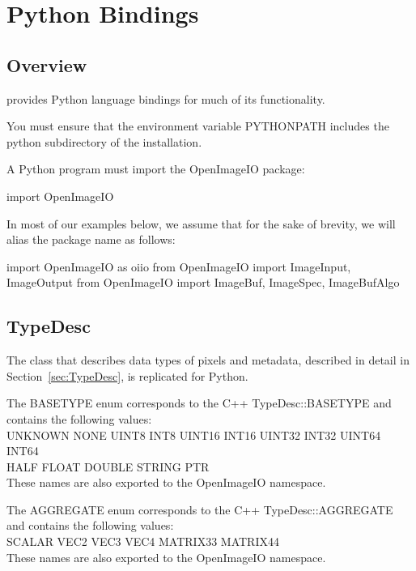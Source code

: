 \chapter{Python Bindings}
\label{chap:pythonbindings}

\section{Overview}

\OpenImageIO provides Python language bindings for much of its
functionality.

\smallskip

You must ensure that the environment variable {\cf PYTHONPATH} includes
the {\cf python} subdirectory of the \OpenImageIO installation.

\smallskip

A Python program must import the {\cf OpenImageIO} package:
\begin{code}
    import OpenImageIO
\end{code}
\noindent In most of our examples below, we assume that for the sake
of brevity, we will alias the package name as follows:
\begin{code}
    import OpenImageIO as oiio
    from OpenImageIO import ImageInput, ImageOutput
    from OpenImageIO import ImageBuf, ImageSpec, ImageBufAlgo
\end{code}

\section{TypeDesc}
\label{sec:pythontypedesc}

The \TypeDesc class that describes data types of pixels and metadata,
described in detail in Section~\ref{sec:TypeDesc}, is replicated for Python.

The {\cf BASETYPE} enum corresponds to the C++ {\cf TypeDesc::BASETYPE} and
contains the following values: \\
{\cf UNKNOWN NONE UINT8 INT8 UINT16 INT16 UINT32 INT32 UINT64 INT64 \\
HALF FLOAT DOUBLE STRING PTR} \\
These names are also exported to the {\cf OpenImageIO} namespace.
\apiend

The {\cf AGGREGATE} enum corresponds to the C++ {\cf TypeDesc::AGGREGATE} and
contains the following values: \\
{\cf SCALAR VEC2 VEC3 VEC4 MATRIX33 MATRIX44} \\
These names are also exported to the {\cf OpenImageIO} namespace.
\apiend

